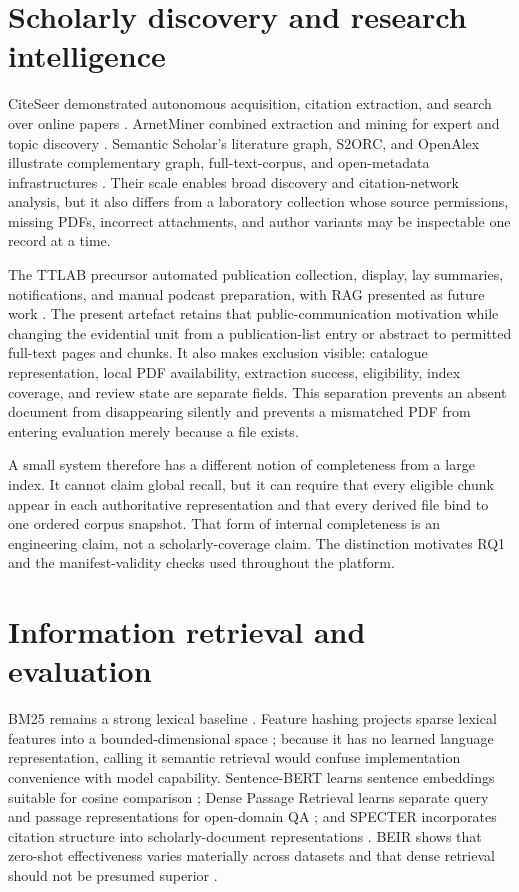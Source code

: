 \section{Scholarly discovery and research intelligence}

CiteSeer demonstrated autonomous acquisition, citation extraction, and search over online papers \cite{giles1998citeseer}. ArnetMiner combined extraction and mining for expert and topic discovery \cite{tang2008arnetminer}. Semantic Scholar's literature graph, S2ORC, and OpenAlex illustrate complementary graph, full-text-corpus, and open-metadata infrastructures \cite{ammar2018literaturegraph,lo2020s2orc,priem2022openalex}. Their scale enables broad discovery and citation-network analysis, but it also differs from a laboratory collection whose source permissions, missing PDFs, incorrect attachments, and author variants may be inspectable one record at a time.

The TTLAB precursor automated publication collection, display, lay summaries, notifications, and manual podcast preparation, with RAG presented as future work \cite{narine2025automating}. The present artefact retains that public-communication motivation while changing the evidential unit from a publication-list entry or abstract to permitted full-text pages and chunks. It also makes exclusion visible: catalogue representation, local PDF availability, extraction success, eligibility, index coverage, and review state are separate fields. This separation prevents an absent document from disappearing silently and prevents a mismatched PDF from entering evaluation merely because a file exists.

A small system therefore has a different notion of completeness from a large index. It cannot claim global recall, but it can require that every eligible chunk appear in each authoritative representation and that every derived file bind to one ordered corpus snapshot. That form of internal completeness is an engineering claim, not a scholarly-coverage claim. The distinction motivates RQ1 and the manifest-validity checks used throughout the platform.

\section{Information retrieval and evaluation}

BM25 remains a strong lexical baseline \cite{robertson2009bm25}. Feature hashing projects sparse lexical features into a bounded-dimensional space \cite{weinberger2009featurehashing}; because it has no learned language representation, calling it semantic retrieval would confuse implementation convenience with model capability. Sentence-BERT learns sentence embeddings suitable for cosine comparison \cite{reimers2019sentencebert}; Dense Passage Retrieval learns separate query and passage representations for open-domain QA \cite{karpukhin2020dpr}; and SPECTER incorporates citation structure into scholarly-document representations \cite{cohan2020specter}. BEIR shows that zero-shot effectiveness varies materially across datasets and that dense retrieval should not be presumed superior \cite{thakur2021beir}.

